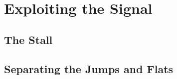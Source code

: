 \section{Exploiting the Signal}

\subsection{The Stall}

\subsection{Separating the Jumps and Flats}
